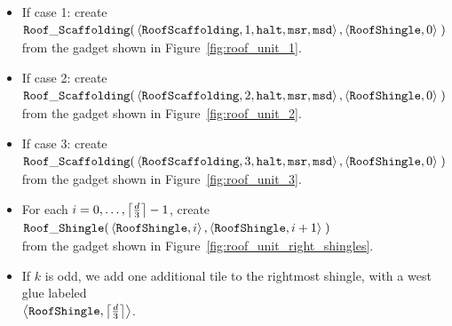     \begin{itemize}
        \item If case 1: create
        $\begin{aligned}[t]
            \roofscaffolding(& \left\langle {\tt RoofScaffolding}, 1, {\tt halt}, {\tt msr}, {\tt msd} \right\rangle,
                               \left\langle {\tt RoofShingle},     0                                   \right\rangle \;)
        \end{aligned}$\\from the gadget shown in Figure~\ref{fig:roof_unit_1}.

        \item If case 2: create
        $\begin{aligned}[t]
            \roofscaffolding(& \left\langle {\tt RoofScaffolding}, 2, {\tt halt}, {\tt msr}, {\tt msd} \right\rangle,
                               \left\langle {\tt RoofShingle},     0                                   \right\rangle \;)
            \end{aligned}$\\from the gadget shown in Figure~\ref{fig:roof_unit_2}.

        \item If case 3: create
        $\begin{aligned}[t]
            \roofscaffolding(& \left\langle {\tt RoofScaffolding}, 3, {\tt halt}, {\tt msr}, {\tt msd} \right\rangle,
                               \left\langle {\tt RoofShingle},     0                                   \right\rangle \;)
            \end{aligned}$\\from the gadget shown in Figure~\ref{fig:roof_unit_3}.

        \item For each $i = 0,\ldots,\ceil*{\frac{d}{3}} - 1$, create
        $\begin{aligned}[t]
            \roofshingle(& \left\langle {\tt RoofShingle}, i     \right\rangle,
                           \left\langle {\tt RoofShingle}, i + 1 \right\rangle \;)
            \end{aligned}$\\from the gadget shown in Figure~\ref{fig:roof_unit_right_shingles}.

        \item If $k$ is odd, we add one additional tile to the rightmost shingle, with a west glue
              labeled\\ $\left\langle {\tt RoofShingle}, \ceil*{\frac{d}{3}} \right\rangle$.
    \end{itemize}



